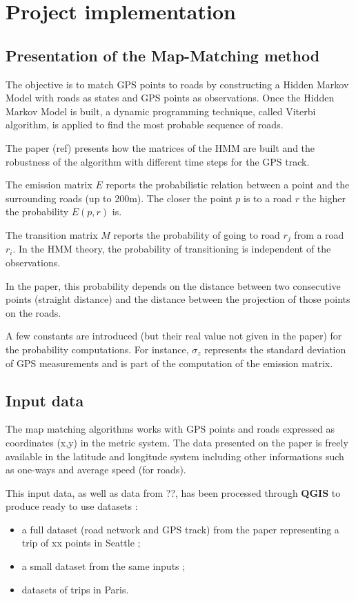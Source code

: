 \chapter{Project implementation}

\section{Presentation of the Map-Matching method}

The objective is to match GPS points to roads by constructing a Hidden Markov Model with roads as states and GPS points as observations. Once the Hidden Markov Model is built, a dynamic programming technique, called Viterbi algorithm, is applied to find the most probable sequence of roads.

The paper (ref) presents how the matrices of the HMM are built and the robustness of the algorithm with different time steps for the GPS track.

The emission matrix $E$ reports the probabilistic relation between a point and the surrounding roads (up to 200m). 
The closer the point $p$ is to a road $r$ the higher the probability $E(p,r)$ is.
	
The transition matrix $M$ reports the probability of going to road $r_j$ from a road $r_i$. In the HMM theory, the probability of transitioning is independent of the observations.

In the paper, this probability depends on the distance between two consecutive points (straight distance) and the distance between the projection of those points on the roads.

A few constants are introduced (but their real value not given in the paper) for the probability computations. For instance, $\sigma_z$ represents the standard deviation of GPS measurements and is part of the computation of the emission matrix.  

\section{Input data}

The map matching algorithms works with GPS points and roads expressed as coordinates (x,y) in the metric system. 
The data presented on the paper is freely available in the latitude and longitude system including other informations such as one-ways and average speed (for roads).

This input data, as well as data from ??, has been processed through \textbf{QGIS} to produce ready to use datasets :
\begin{itemize}
	\item a full dataset (road network and GPS track) from the paper representing a trip of xx points in Seattle ;
	\item a small dataset from the same inputs ;
	\item datasets of trips in Paris.
\end{itemize}

